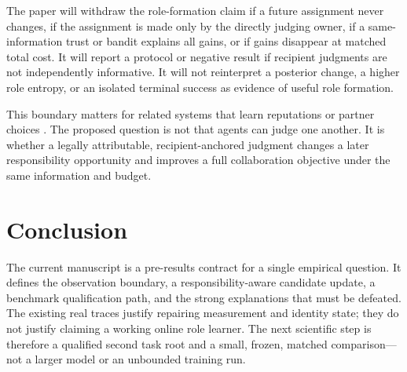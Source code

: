\documentclass[sigconf,anonymous]{aamas}
\begin{document}
The paper will withdraw the role-formation claim if a future assignment never changes, if
the assignment is made only by the directly judging owner, if a same-information trust or
bandit explains all gains, or if gains disappear at matched total cost. It will report a
protocol or negative result if recipient judgments are not independently informative. It
will not reinterpret a posterior change, a higher role entropy, or an isolated terminal
success as evidence of useful role formation.

This boundary matters for related systems that learn reputations or partner choices
\cite{ren2026reputation,leung2025partner,yang2025agentnet}. The proposed question is not
that agents can judge one another. It is whether a legally attributable, recipient-anchored
judgment changes a later responsibility opportunity and improves a full collaboration
objective under the same information and budget.

\section{Conclusion}

The current manuscript is a pre-results contract for a single empirical question. It
defines the observation boundary, a responsibility-aware candidate update, a benchmark
qualification path, and the strong explanations that must be defeated. The existing real
traces justify repairing measurement and identity state; they do not justify claiming a
working online role learner. The next scientific step is therefore a qualified second task
root and a small, frozen, matched comparison—not a larger model or an unbounded training
run.



\end{document}

